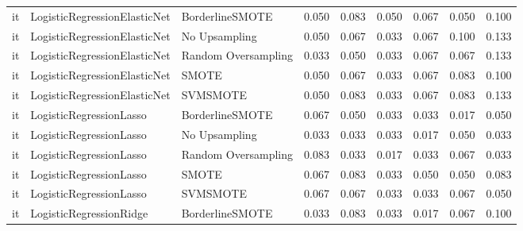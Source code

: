 \begin{tabular}{lllllllll}
      it & LogisticRegressionElasticNet &     BorderlineSMOTE & 0.050 &                     0.083 &                 0.050 &                  0.067 &                                   0.050 &     0.100 \\
      it & LogisticRegressionElasticNet &       No Upsampling & 0.050 &                     0.067 &                 0.033 &                  0.067 &                                   0.100 &     0.133 \\
      it & LogisticRegressionElasticNet & Random Oversampling & 0.033 &                     0.050 &                 0.033 &                  0.067 &                                   0.067 &     0.133 \\
      it & LogisticRegressionElasticNet &               SMOTE & 0.050 &                     0.067 &                 0.033 &                  0.067 &                                   0.083 &     0.100 \\
      it & LogisticRegressionElasticNet &            SVMSMOTE & 0.050 &                     0.083 &                 0.033 &                  0.067 &                                   0.083 &     0.133 \\
      it &      LogisticRegressionLasso &     BorderlineSMOTE & 0.067 &                     0.050 &                 0.033 &                  0.033 &                                   0.017 &     0.050 \\
      it &      LogisticRegressionLasso &       No Upsampling & 0.033 &                     0.033 &                 0.033 &                  0.017 &                                   0.050 &     0.033 \\
      it &      LogisticRegressionLasso & Random Oversampling & 0.083 &                     0.033 &                 0.017 &                  0.033 &                                   0.067 &     0.033 \\
      it &      LogisticRegressionLasso &               SMOTE & 0.067 &                     0.083 &                 0.033 &                  0.050 &                                   0.050 &     0.083 \\
      it &      LogisticRegressionLasso &            SVMSMOTE & 0.067 &                     0.067 &                 0.033 &                  0.033 &                                   0.067 &     0.050 \\
      it &      LogisticRegressionRidge &     BorderlineSMOTE & 0.033 &                     0.083 &                 0.033 &                  0.017 &                                   0.067 &     0.100 \\

\end{tabular}
